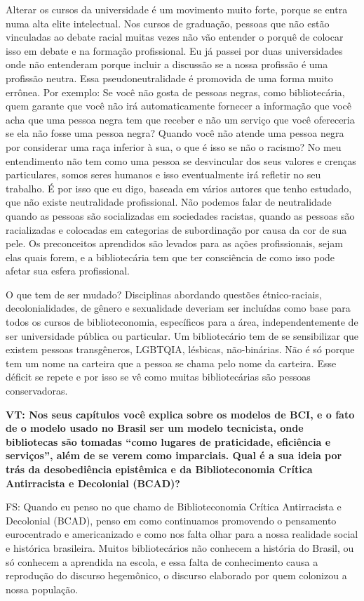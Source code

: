 \documentclass[a4paper,
fontsize=11pt,
oneside,
numbers=noperiodatend,
parskip=half-,
bibliography=totoc,
final
]{scrartcl}
\begin{document}
Alterar os cursos da universidade é um movimento muito forte, porque se
entra numa alta elite intelectual. Nos cursos de graduação, pessoas que
não estão vinculadas ao debate racial muitas vezes não vão entender o
porquê de colocar isso em debate e na formação profissional. Eu já
passei por duas universidades onde não entenderam porque incluir a
discussão se a nossa profissão é uma profissão neutra. Essa
pseudoneutralidade é promovida de uma forma muito errônea. Por exemplo:
Se você não gosta de pessoas negras, como bibliotecária, quem garante
que você não irá automaticamente fornecer a informação que você acha que
uma pessoa negra tem que receber e não um serviço que você ofereceria se
ela não fosse uma pessoa negra? Quando você não atende uma pessoa negra
por considerar uma raça inferior à sua, o que é isso se não o racismo?
No meu entendimento não tem como uma pessoa se desvincular dos seus
valores e crenças particulares, somos seres humanos e isso eventualmente
irá refletir no seu trabalho. É por isso que eu digo, baseada em vários
autores que tenho estudado, que não existe neutralidade profissional.
Não podemos falar de neutralidade quando as pessoas são socializadas em
sociedades racistas, quando as pessoas são racializadas e colocadas em
categorias de subordinação por causa da cor de sua pele. Os preconceitos
aprendidos são levados para as ações profissionais, sejam elas quais
forem, e a bibliotecária tem que ter consciência de como isso pode
afetar sua esfera profissional.

O que tem de ser mudado? Disciplinas abordando questões étnico-raciais,
decolonialidades, de gênero e sexualidade deveriam ser incluídas como
base para todos os cursos de biblioteconomia, específicos para a área,
independentemente de ser universidade pública ou particular. Um
bibliotecário tem de se sensibilizar que existem pessoas transgêneros,
LGBTQIA, lésbicas, não-binárias. Não é só porque tem um nome na carteira
que a pessoa se chama pelo nome da carteira. Esse déficit se repete e
por isso se vê como muitas bibliotecárias são pessoas conservadoras.

\textbf{VT: Nos seus capítulos você explica sobre os modelos de BCI, e o
fato de o modelo usado no Brasil ser um modelo tecnicista, onde
bibliotecas são tomadas \enquote{como lugares de praticidade, eficiência
e serviços}, além de se verem como imparciais. Qual é a sua ideia por
trás da desobediência epistêmica e da Biblioteconomia Crítica
Antirracista e Decolonial (BCAD)?}

FS: Quando eu penso no que chamo de Biblioteconomia Crítica Antirracista
e Decolonial \linebreak (BCAD), penso em como continuamos promovendo o pensamento
eurocentrado e americanizado e como nos falta olhar para a nossa
realidade social e histórica brasileira. Muitos bibliotecários não
conhecem a história do Brasil, ou só conhecem a aprendida na escola, e
essa falta de conhecimento causa a reprodução do discurso hegemônico, o
discurso elaborado por quem colonizou a nossa população.
\end{document}
